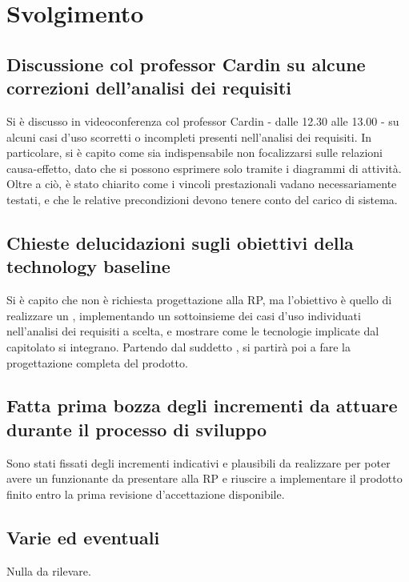 \newpage
\section*{Svolgimento}

	\subsection*{Discussione col professor Cardin su alcune correzioni dell'analisi dei requisiti}
		Si è discusso in videoconferenza col professor Cardin - dalle 12.30 alle 13.00 - su alcuni casi d'uso scorretti o incompleti presenti nell'analisi dei requisiti. In particolare, si è capito come sia indispensabile non focalizzarsi sulle relazioni causa-effetto, dato che si possono esprimere solo tramite i diagrammi di attività.
		Oltre a ciò, è stato chiarito come i vincoli prestazionali vadano necessariamente testati, e che le relative precondizioni devono tenere conto del carico di sistema.

	\subsection*{Chieste delucidazioni sugli obiettivi della technology baseline}
		Si è capito che non è richiesta progettazione alla RP, ma l'obiettivo è quello di realizzare un , implementando un sottoinsieme dei casi d'uso individuati nell'analisi dei requisiti a scelta, e mostrare come le tecnologie implicate dal capitolato si integrano. Partendo dal suddetto , si partirà poi a fare la progettazione completa del prodotto.

	\subsection*{Fatta prima bozza degli incrementi da attuare durante il processo di sviluppo}
		Sono stati fissati degli incrementi indicativi e plausibili da realizzare per poter
		avere un  funzionante da presentare alla RP e riuscire a implementare il prodotto finito entro la prima revisione d'accettazione disponibile.

	\subsection*{Varie ed eventuali}
		Nulla da rilevare.